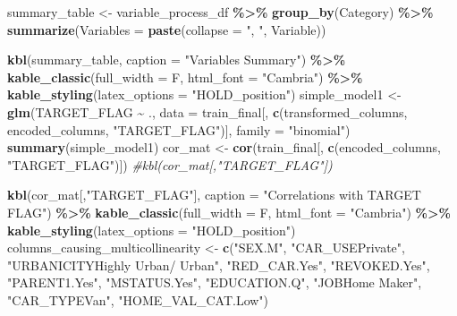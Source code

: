 \documentclass[
]{article}
\newenvironment{Shaded}{\begin{snugshade}}{\end{snugshade}}
\newcommand{\AttributeTok}[1]{\textcolor[rgb]{0.13,0.29,0.53}{#1}}
\newcommand{\CommentTok}[1]{\textcolor[rgb]{0.56,0.35,0.01}{\textit{#1}}}
\newcommand{\FunctionTok}[1]{\textcolor[rgb]{0.13,0.29,0.53}{\textbf{#1}}}
\newcommand{\NormalTok}[1]{#1}
\newcommand{\OtherTok}[1]{\textcolor[rgb]{0.56,0.35,0.01}{#1}}
\newcommand{\SpecialCharTok}[1]{\textcolor[rgb]{0.81,0.36,0.00}{\textbf{#1}}}
\newcommand{\StringTok}[1]{\textcolor[rgb]{0.31,0.60,0.02}{#1}}
\begin{document}
\begin{Shaded}
\begin{Highlighting}[]
\NormalTok{summary\_table }\OtherTok{\textless{}{-}}\NormalTok{ variable\_process\_df }\SpecialCharTok{\%\textgreater{}\%}
  \FunctionTok{group\_by}\NormalTok{(Category) }\SpecialCharTok{\%\textgreater{}\%}
  \FunctionTok{summarize}\NormalTok{(}\AttributeTok{Variables =} \FunctionTok{paste}\NormalTok{(}\AttributeTok{collapse =} \StringTok{", "}\NormalTok{, Variable))}

\FunctionTok{kbl}\NormalTok{(summary\_table, }\AttributeTok{caption =} \StringTok{"Variables Summary"}\NormalTok{) }\SpecialCharTok{\%\textgreater{}\%}
  \FunctionTok{kable\_classic}\NormalTok{(}\AttributeTok{full\_width =}\NormalTok{ F, }\AttributeTok{html\_font =} \StringTok{"Cambria"}\NormalTok{) }\SpecialCharTok{\%\textgreater{}\%}
  \FunctionTok{kable\_styling}\NormalTok{(}\AttributeTok{latex\_options =} \StringTok{"HOLD\_position"}\NormalTok{)}
\NormalTok{simple\_model1 }\OtherTok{\textless{}{-}} \FunctionTok{glm}\NormalTok{(TARGET\_FLAG }\SpecialCharTok{\textasciitilde{}}\NormalTok{ ., }\AttributeTok{data =}\NormalTok{ train\_final[, }\FunctionTok{c}\NormalTok{(transformed\_columns, encoded\_columns, }\StringTok{"TARGET\_FLAG"}\NormalTok{)], }\AttributeTok{family =} \StringTok{"binomial"}\NormalTok{)}
\FunctionTok{summary}\NormalTok{(simple\_model1)}
\NormalTok{cor\_mat }\OtherTok{\textless{}{-}} \FunctionTok{cor}\NormalTok{(train\_final[, }\FunctionTok{c}\NormalTok{(encoded\_columns, }\StringTok{"TARGET\_FLAG"}\NormalTok{)])}
\CommentTok{\#kbl(cor\_mat[,"TARGET\_FLAG"])}


\FunctionTok{kbl}\NormalTok{(cor\_mat[,}\StringTok{"TARGET\_FLAG"}\NormalTok{], }\AttributeTok{caption =} \StringTok{"Correlations with TARGET FLAG"}\NormalTok{) }\SpecialCharTok{\%\textgreater{}\%}
  \FunctionTok{kable\_classic}\NormalTok{(}\AttributeTok{full\_width =}\NormalTok{ F, }\AttributeTok{html\_font =} \StringTok{"Cambria"}\NormalTok{) }\SpecialCharTok{\%\textgreater{}\%}
  \FunctionTok{kable\_styling}\NormalTok{(}\AttributeTok{latex\_options =} \StringTok{"HOLD\_position"}\NormalTok{)}
\NormalTok{columns\_causing\_multicollinearity }\OtherTok{\textless{}{-}} \FunctionTok{c}\NormalTok{(}\StringTok{"SEX.M"}\NormalTok{, }\StringTok{"CAR\_USEPrivate"}\NormalTok{, }\StringTok{"URBANICITYHighly Urban/ Urban"}\NormalTok{,}
                                       \StringTok{"RED\_CAR.Yes"}\NormalTok{, }\StringTok{"REVOKED.Yes"}\NormalTok{, }\StringTok{"PARENT1.Yes"}\NormalTok{, }\StringTok{"MSTATUS.Yes"}\NormalTok{, }
                                       \StringTok{"EDUCATION.Q"}\NormalTok{, }\StringTok{"JOBHome Maker"}\NormalTok{, }\StringTok{"CAR\_TYPEVan"}\NormalTok{, }\StringTok{"HOME\_VAL\_CAT.Low"}\NormalTok{)}


\end{Highlighting}
\end{Shaded}
\end{document}

